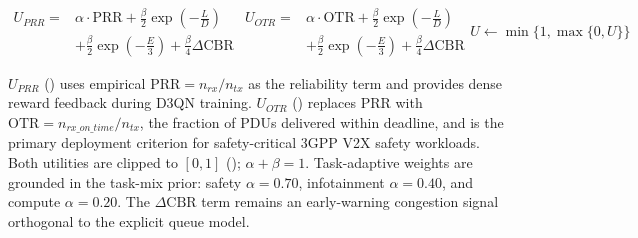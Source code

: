 \begin{subequations}
\label{eq:utility_all}
\begin{equation}
\begin{split}U_{PRR} ={}& \alpha \cdot \text{PRR} + \frac{\beta}{2}\exp\left(-\frac{L}{D}\right) \\ &+ \frac{\beta}{2}\exp\left(-\frac{E}{3}\right) + \frac{\beta}{4}\Delta\text{CBR}\end{split}
\label{eq:uprr}
\end{equation}

\begin{equation}
\begin{split}U_{OTR} ={}& \alpha \cdot \text{OTR} + \frac{\beta}{2}\exp\left(-\frac{L}{D}\right) \\ &+ \frac{\beta}{2}\exp\left(-\frac{E}{3}\right) + \frac{\beta}{4}\Delta\text{CBR}\end{split}
\label{eq:uotr}
\end{equation}

\begin{equation}
U \leftarrow \min\{1,\max\{0,U\}\}
\label{eq:uclip}
\end{equation}
\end{subequations}

$U_{PRR}$ () uses empirical $\text{PRR} = n_{rx}/n_{tx}$ as the reliability term and provides dense reward feedback during D3QN training. $U_{OTR}$ () replaces PRR with $\text{OTR} = n_{rx\_on\_time}/n_{tx}$, the fraction of PDUs delivered within deadline, and is the primary deployment criterion for safety-critical 3GPP V2X safety workloads. Both utilities are clipped to $[0,1]$ (); $\alpha + \beta = 1$. Task-adaptive weights are grounded in the task-mix prior: safety $\alpha=0.70$, infotainment $\alpha=0.40$, and compute $\alpha=0.20$. The $\Delta\text{CBR}$ term remains an early-warning congestion signal orthogonal to the explicit queue model.

